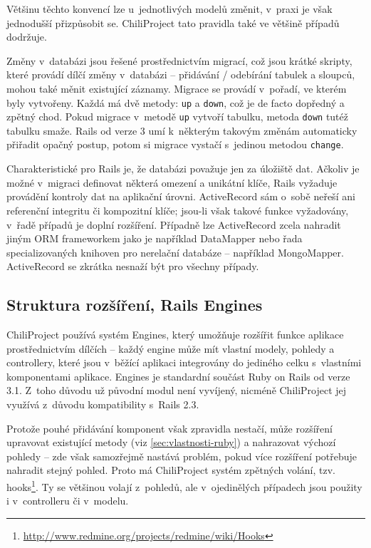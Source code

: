 \documentclass[thesis=B,czech]{FITthesis}[2012/05/02]
\begin{document}
Většinu těchto konvencí lze u~jednotlivých modelů změnit, v~praxi je
však jednodušší přizpůsobit se. ChiliProject tato pravidla také ve
většině případů dodržuje.

Změny v~databázi jsou řešené prostřednictvím migrací, což jsou krátké
skripty, které provádí dílčí změny v~databázi -- přidávání / odebírání
tabulek a sloupců, mohou také měnit existující záznamy. Migrace se
provádí v~pořadí, ve kterém byly vytvořeny. Každá má dvě metody:
\lstinline!up! a \lstinline!down!, což je de facto dopředný a zpětný
chod. Pokud migrace v~metodě \lstinline!up! vytvoří tabulku, metoda
\lstinline!down! tutéž tabulku smaže. Rails od verze 3 umí k~některým
takovým změnám automaticky přiřadit opačný postup, potom si migrace
vystačí s~jedinou metodou \lstinline!change!.

Charakteristické pro Rails je, že databázi považuje jen za 
úložiště dat. Ačkoliv je možné v~migraci definovat některá omezení a unikátní klíče,
Rails vyžaduje provádění kontroly dat na aplikační úrovni.
ActiveRecord sám o~sobě neřeší ani referenční integritu či
kompozitní klíče; jsou-li však takové funkce vyžadovány, v~řadě případů
je doplní rozšíření. Případně lze ActiveRecord zcela nahradit jiným ORM
frameworkem jako je například DataMapper nebo řada specializovaných
knihoven pro nerelační databáze -- například MongoMapper. ActiveRecord
se zkrátka nesnaží být  pro všechny případy.

\subsection{Struktura rozšíření, Rails Engines}

ChiliProject používá systém Engines, který umožňuje rozšířit
funkce aplikace prostřednictvím dílčích  -- každý
engine může mít vlastní modely, pohledy a controllery, které jsou
v~běžící aplikaci integrovány do jediného celku s~vlastními komponentami
aplikace. Engines je standardní součást Ruby on Rails od verze 3.1.
Z~toho důvodu už původní modul není vyvíjený, nicméně ChiliProject jej
využívá z~důvodu kompatibility s~Rails 2.3.

Protože pouhé přidávání komponent však zpravidla nestačí, může rozšíření
upravovat existující metody (viz
\ref{sec:vlastnosti-ruby}) a
nahrazovat výchozí pohledy -- zde však samozřejmě nastává problém, pokud
více rozšíření potřebuje nahradit stejný pohled. Proto má ChiliProject
systém zpětných volání, tzv. hooks\footnote{\url{http://www.redmine.org/projects/redmine/wiki/Hooks}}.
Ty se většinou volají z~pohledů, ale v~ojedinělých případech jsou
použity i v~controlleru či v~modelu.
\end{document}
